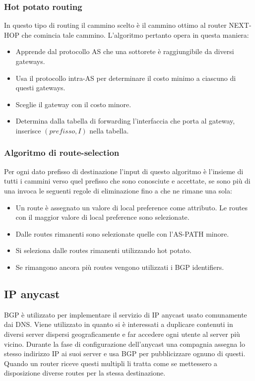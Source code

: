 \subsubsection{Hot potato routing}
In questo tipo di routing il cammino scelto \`e il cammino ottimo al router NEXT-HOP che comincia tale cammino. L'algoritmo pertanto opera in questa 
maniera:
\begin{itemize}
\item Apprende dal protocollo AS che una sottorete \`e raggiungibile da diversi gateways.
\item Usa il protocollo intra-AS per determinare il costo minimo a ciascuno di questi gateways.
\item Sceglie il gateway con il costo minore.
\item Determina dalla tabella di forwarding l'interfaccia che porta al gateway, inserisce $(prefisso, I)$ nella tabella. 
\end{itemize}
\subsubsection{Algoritmo di route-selection}
Per ogni dato prefisso di destinazione l'input di questo algoritmo \`e l'insieme di tutti i cammini verso quel prefisso che sono conosciute e accettate, se 
sono pi\`u di una invoca le seguenti regole di eliminazione fino a che ne rimane una sola:
\begin{itemize}
\item Un route \`e assegnato un valore di local preference come attributo. Le routes con il maggior valore di local preference sono selezionate.
\item Dalle routes rimanenti sono selezionate quelle con l'AS-PATH minore. 
\item Si seleziona dalle routes rimanenti utilizzando hot potato.
\item Se rimangono ancora pi\`u routes vengono utilizzati i BGP identifiers. 
\end{itemize}
\subsection{IP anycast}
BGP \`e utilizzato per implementare il servizio di IP anycast usato comunamente dai DNS. Viene utilizzato in quanto si \`e interessati a duplicare contenuti
in diversi server dispersi geograficamente e far accedere ogni utente al server pi\`u vicino. Durante la fase di configurazione dell'anycast una compagnia
assegna lo stesso indirizzo IP ai suoi server e usa BGP per pubblicizzare ognuno di questi. Quando un router riceve questi multipli li tratta come se 
mettessero a disposizione diverse routes per la stessa destinazione. 
